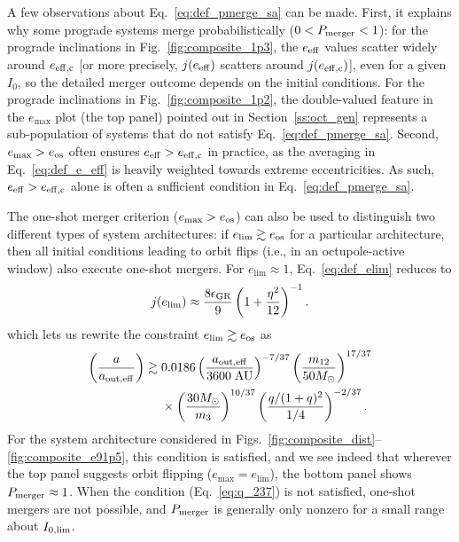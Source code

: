 \documentclass[
        fleqn,
        usenatbib,
    ]{mnras}
\newcommand*{\p}[1]{\left(#1\right)}
\begin{document}
A few observations about Eq.~\eqref{eq:def_pmerge_sa} can be made. First, it
explains why some prograde systems merge probabilistically ($0 < P_{\rm merger}
< 1$): for the prograde inclinations in Fig.~\ref{fig:composite_1p3},
the $e_{\rm eff}$ values scatter widely around $e_{\rm eff,c}$ [or more
precisely, $j(e_{\rm eff})$ scatters around $j(e_{\rm eff,c})$], even for a
given $I_0$, so the detailed merger outcome depends on the initial conditions.
For the prograde inclinations in Fig.~\ref{fig:composite_1p2}, the double-valued
feature in the $e_{\max}$ plot (the top panel) pointed out in
Section~\ref{ss:oct_gen} represents a sub-population of systems that do not
satisfy Eq.~\eqref{eq:def_pmerge_sa}. Second, $e_{\max} > e_{\rm os}$ often
ensures $e_{\rm eff} > e_{\rm eff, c}$ in practice, as the averaging in
Eq.~\eqref{eq:def_e_eff} is heavily weighted towards extreme eccentricities. As
such, $e_{\rm eff} > e_{\rm eff, c}$ alone is often a sufficient condition in
Eq.~\eqref{eq:def_pmerge_sa}.

The one-shot merger criterion ($e_{\max} > e_{\rm os}$) can also be used to
distinguish two different types of system architectures: if $e_{\lim} \gtrsim
e_{\rm os}$ for a particular architecture, then all initial conditions leading
to orbit flips (i.e., in an octupole-active window) also execute one-shot
mergers. For $e_{\lim} \approx 1$, Eq.~\eqref{eq:def_elim} reduces to
\begin{align}
    j(e_{\lim}) \approx \frac{8\epsilon_{\rm GR}}{9}\p{1 +
        \frac{\eta^2}{12}}^{-1}.
\end{align}
which lets us rewrite the constraint $e_{\lim} \gtrsim e_{\rm os}$ as
\begin{align}
    \p{\frac{a}{a_{\rm out, eff}}} \gtrsim{}&
        0.0186
        \p{\frac{a_{\rm out, eff}}{3600\;\mathrm{AU}}}^{-7/37}
        \p{\frac{m_{12}}{50M_{\odot}}}^{17/37}\nonumber\\
        &\times\p{\frac{30M_{\odot}}{m_3}}^{10/37}
        \p{\frac{q / (1 + q)^2}{1/4}}^{-2/37}.\label{eq:q_237}
\end{align}
For the system architecture considered in
Figs.~\ref{fig:composite_dist}--\ref{fig:composite_e91p5}, this condition is
satisfied, and we see indeed that wherever the top panel suggests orbit flipping
($e_{\max} = e_{\lim}$), the bottom panel shows $P_{\rm merger} \approx 1$. When
the condition (Eq.~\ref{eq:q_237}) is not satisfied, one-shot mergers are not
possible, and $P_{\rm merger}$ is generally only nonzero for a small range about
$I_{\rm 0, \lim}$.
\end{document}
